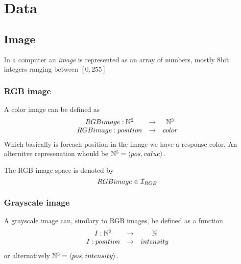 

\section{Data}
\subsection{Image}
In a computer an \emph{image} is represented as an array of numbers, mostly 8bit integers ranging between $\left[0,255\right]$ 

\subsubsection{RGB image}
A color image can be defined as
\begin{equation}
    \begin{array}{ccc}
    RGBimage : \mathbb{N}^2 &\rightarrow& \mathbb{N}^3\\
    RGBimage : position&\rightarrow&color
    \end{array}
\end{equation}
Which basically is foreach position in the image we have a response color.
An alternitve represenation whould be $\mathbb{N}^5=\langle pos,value\rangle$.

The RGB image space is denoted by
\begin{equation}
    RGBimage\in \mathcal{I}_{RGB}
\end{equation}

\subsubsection{Grayscale image}
A grayscale image can, similary to RGB images, be defined as a function
\begin{equation}
    \begin{array}{ccc}
    I : \mathbb{N}^2 &\rightarrow& \mathbb{N}\\
    I : position&\rightarrow&intensity
    \end{array}
\end{equation}
or alternatively $\mathbb{N}^3=\langle pos,intensity\rangle$.

